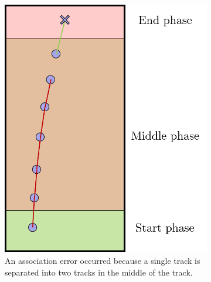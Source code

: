 \begin{figure}[htbp]
	\centering
	\begin{subfigure}[t]{0.3\textwidth}
		\includegraphics[width=\textwidth]{figures/Asso/association error example1.png}
		\caption{An association error occurred because a single track is separated into two tracks in the middle of the track.}
	\end{subfigure}
	\quad
	\begin{subfigure}[t]{0.3\textwidth}

\end{subfigure}
\end{figure}
